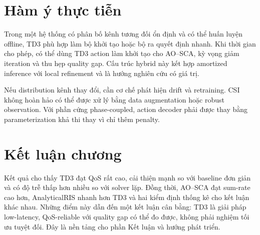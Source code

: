 \section{Hàm ý thực tiễn}
Trong một hệ thống có phân bố kênh tương đối ổn định và có thể huấn luyện offline, TD3 phù hợp làm bộ khởi tạo hoặc bộ ra quyết định nhanh. Khi thời gian cho phép, có thể dùng TD3 action làm khởi tạo cho AO--SCA, kỳ vọng giảm iteration và thu hẹp quality gap. Cấu trúc hybrid này kết hợp amortized inference với local refinement và là hướng nghiên cứu có giá trị.

Nếu distribution kênh thay đổi, cần cơ chế phát hiện drift và retraining. CSI không hoàn hảo có thể được xử lý bằng data augmentation hoặc robust observation. Với phần cứng phase-coupled, action decoder phải được thay bằng parameterization khả thi thay vì chỉ thêm penalty.

\section{Kết luận chương}
Kết quả cho thấy TD3 đạt QoS rất cao, cải thiện mạnh so với baseline đơn giản và có độ trễ thấp hơn nhiều so với solver lặp. Đồng thời, AO--SCA đạt sum-rate cao hơn, AnalyticalRIS nhanh hơn TD3 và hai kiểm định thống kê cho kết luận khác nhau. Những điểm này dẫn đến một kết luận cân bằng: TD3 là giải pháp low-latency, QoS-reliable với quality gap có thể đo được, không phải nghiệm tối ưu tuyệt đối. Đây là nền tảng cho phần Kết luận và hướng phát triển.
